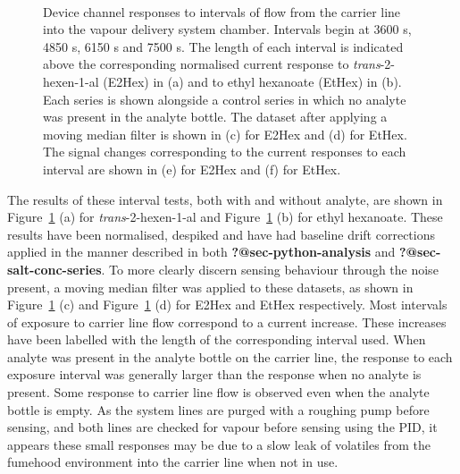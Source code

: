 \documentclass[
  a4paper,
]{scrbook}
\begin{document}
\begin{figure}
\begin{minipage}[t]{0.45\linewidth}
{{}

}

\end{minipage}%
%
\begin{minipage}[t]{0.01\linewidth}

{\centering 

~

}

\end{minipage}%

\caption{\label{fig-EtHex-sampling}Device channel responses to intervals
of flow from the carrier line into the vapour delivery system chamber.
Intervals begin at 3600 s, 4850 s, 6150 s and 7500 s. The length of each
interval is indicated above the corresponding normalised current
response to \emph{trans}-2-hexen-1-al (E2Hex) in (a) and to ethyl
hexanoate (EtHex) in (b). Each series is shown alongside a control
series in which no analyte was present in the analyte bottle. The
dataset after applying a moving median filter is shown in (c) for E2Hex
and (d) for EtHex. The signal changes corresponding to the current
responses to each interval are shown in (e) for E2Hex and (f) for
EtHex.}

\end{figure}

The results of these interval tests, both with and without analyte, are
shown in Figure~\ref{fig-EtHex-sampling} (a) for
\emph{trans}-2-hexen-1-al and Figure~\ref{fig-EtHex-sampling} (b) for
ethyl hexanoate. These results have been normalised, despiked and have
had baseline drift corrections applied in the manner described in both
\textbf{?@sec-python-analysis} and \textbf{?@sec-salt-conc-series}. To
more clearly discern sensing behaviour through the noise present, a
moving median filter was applied to these datasets, as shown in
Figure~\ref{fig-EtHex-sampling} (c) and Figure~\ref{fig-EtHex-sampling}
(d) for E2Hex and EtHex respectively. Most intervals of exposure to
carrier line flow correspond to a current increase. These increases have
been labelled with the length of the corresponding interval used. When
analyte was present in the analyte bottle on the carrier line, the
response to each exposure interval was generally larger than the
response when no analyte is present. Some response to carrier line flow
is observed even when the analyte bottle is empty. As the system lines
are purged with a roughing pump before sensing, and both lines are
checked for vapour before sensing using the PID, it appears these small
responses may be due to a slow leak of volatiles from the fumehood
environment into the carrier line when not in use.
\end{document}
